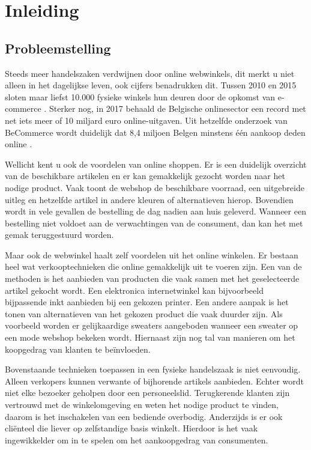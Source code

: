 
\chapter{Inleiding}
\label{ch:inleiding}

\section{Probleemstelling}
\label{sec:probleemstelling}

Steeds meer handelszaken verdwijnen door online webwinkels, dit merkt u niet alleen in het dagelijkse leven, ook cijfers benadrukken dit. Tussen 2010 en 2015 sloten maar liefst 10.000 fysieke winkels hun deuren door de opkomst van e-commerce \autocite{Knack}.
Sterker nog, in 2017 behaald de Belgische onlinesector een record met net iets meer of 10 miljard euro online-uitgaven. Uit hetzelfde onderzoek van BeCommerce wordt duidelijk dat 8,4 miljoen Belgen minstens één aankoop deden online \autocite{BeCommerce}.

Wellicht kent u ook de voordelen van online shoppen. Er is een duidelijk overzicht van de beschikbare artikelen en er kan gemakkelijk gezocht worden naar het nodige product. Vaak toont de webshop de beschikbare voorraad, een uitgebreide uitleg en hetzelfde artikel in andere kleuren of alternatieven hierop. Bovendien wordt in vele gevallen de bestelling de dag nadien aan huis geleverd. Wanneer een bestelling niet voldoet aan de verwachtingen van de consument, dan kan het met gemak teruggestuurd worden. 

Maar ook de webwinkel haalt zelf voordelen uit het online winkelen. Er bestaan heel wat verkooptechnieken die online gemakkelijk uit te voeren zijn. Een van de methoden is het aanbieden van producten die vaak samen met het geselecteerde artikel gekocht wordt. Een elektronica internetwinkel kan bijvoorbeeld bijpassende inkt aanbieden bij een gekozen printer. Een andere aanpak is het tonen van alternatieven van het gekozen product die vaak duurder zijn. Als voorbeeld worden er gelijkaardige sweaters aangeboden wanneer een sweater op een mode webshop bekeken wordt. Hiernaast zijn nog tal van manieren om het koopgedrag van klanten te beïnvloeden. 

Bovenstaande technieken toepassen in een fysieke handelszaak is niet eenvoudig. Alleen verkopers kunnen verwante of bijhorende artikels aanbieden. Echter wordt niet elke bezoeker geholpen door een personeelslid. Terugkerende klanten zijn vertrouwd met de winkelomgeving en weten het nodige product te vinden, daarom is het inschakelen van een bediende overbodig. Anderzijds is er ook cliënteel die liever op zelfstandige basis winkelt. Hierdoor is het vaak ingewikkelder om in te spelen om het aankoopgedrag van consumenten.


